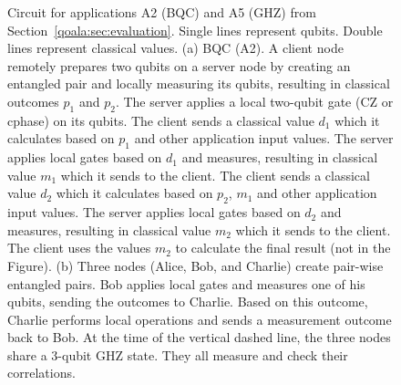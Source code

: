 \begin{figure}
    \centering

    \vspace{1cm}
    \vspace{1cm}

    \caption{
    Circuit for applications A2 (BQC) and A5 (GHZ) from Section~\ref{qoala:sec:evaluation}.
    Single lines represent qubits. Double lines represent classical values.
    (a) BQC (A2). A client node remotely prepares two qubits on a server node by creating an entangled pair and locally measuring its qubits, resulting in classical outcomes $p_1$ and $p_2$.
    The server applies a local two-qubit gate (CZ or cphase) on its qubits.
    The client sends a classical value $d_1$ which it calculates based on $p_1$ and other application input values.
    The server applies local gates based on $d_1$ and measures, resulting in classical value $m_1$ which it sends to the client.
    The client sends a classical value $d_2$ which it calculates based on $p_2$, $m_1$ and other application input values.
    The server applies local gates based on $d_2$ and measures, resulting in classical value $m_2$ which it sends to the client.
    The client uses the values $m_2$ to calculate the final result (not in the Figure).
    (b) Three nodes (Alice, Bob, and Charlie) create pair-wise entangled pairs. Bob applies local gates and measures one of his qubits, sending the outcomes to Charlie.
    Based on this outcome, Charlie performs local operations and sends a measurement outcome back to Bob.
    At the time of the vertical dashed line, the three nodes share a 3-qubit GHZ state. They all measure and check their correlations.
    }
    \label{qoala:fig:app:circuits_2}
\end{figure}



